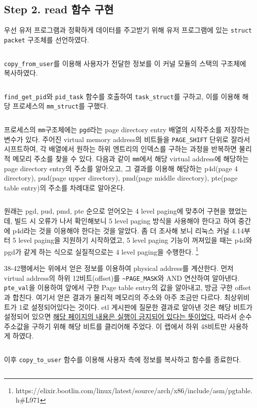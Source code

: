 \documentclass{report}
\begin{document}
\subsection{Step 2. read 함수 구현}
우선 유저 프로그램과 정확하게 데이터를 주고받기 위해 유저 프로그램에 있는 \lstinline{struct packet} 구조체를 선언하였다.
\inputminted[firstline=12,lastline=16, linenos, breaklines, obeytabs=true,tabsize=4]{C}{../kernellab-handout-done/paddr/dbfs_paddr.c}
\lstinline{copy_from_user}를 이용해 사용자가 전달한 정보를 이 커널 모듈의 스택의 구조체에 복사하였다.
\inputminted[firstline=19,lastline=27, linenos, breaklines, obeytabs=true,tabsize=4]{C}{../kernellab-handout-done/paddr/dbfs_paddr.c}
\lstinline{find_get_pid}와 \lstinline{pid_task} 함수를 호출하여 \lstinline{task_struct}를 구하고, 이를 이용해 해당 프로세스의 \lstinline{mm_struct}를 구했다.
\inputminted[firstline=28,lastline=30, linenos, breaklines, obeytabs=true,tabsize=4]{C}{../kernellab-handout-done/paddr/dbfs_paddr.c}
프로세스의 \lstinline{mm}구조체에는 \lstinline{pgd}라는 page directory entry 배열의 시작주소를 저장하는 변수가 있다. 주어진 virtual memory address의 비트들을 \lstinline{PAGE_SHIFT} 단위로 잘라서 시프트하여, 각 배열에서 원하는 하위 엔트리의 인덱스를 구하는 과정을 반복하면 물리적 메모리 주소를 찾을 수 있다.
다음과 같이 \lstinline{mm}에서 해당 virtual address에 해당하는 page directory entry의 주소를 알아오고, 그 결과를 이용해 해당하는 p4d(page 4 directory), pud(page upper directory), pmd(page middle directory), pte(page table entry)의 주소를 차례대로 알아온다.
\inputminted[firstline=31,lastline=37, linenos, breaklines, obeytabs=true,tabsize=4]{C}{../kernellab-handout-done/paddr/dbfs_paddr.c}
원래는 pgd, pud, pmd, pte 순으로 얻어오는 4 level paging에 맞추어 구현을 했었는데, 빌드 시 오류가 나서 확인해보니 5 level paging 방식을 사용해야 한다고 하여 중간에 p4d라는 것을 이용해야 한다는 것을 알았다. 좀 더 조사해 보니 리눅스 커널 4.14부터 5 level paging을 지원하기 시작하였고, 5 level paging 기능이 꺼져있을 때는 p4d와 pgd가 같게 하는 식으로 실질적으로는 4 level paging을 수행한다. \footnote[1]{https://elixir.bootlin.com/linux/latest/source/arch/x86/include/asm/pgtable.h\#L971}

38-42행에서는 위에서 얻은 정보를 이용하여 physical address를 계산한다. 먼저 virtual address의 하위 12비트(offset)를 \lstinline{~PAGE_MASK}와 AND 연산하여 알아낸다. \lstinline{pte_val}을 이용하여 앞에서 구한 Page table entry의 값을 알아내고, 방금 구한 offset과 합친다. 여기서 얻은 결과가 물리적 메모리의 주소와 아주 조금만 다르다.
최상위비트가 1로 설정되어있다는 것이다. etl 게시판에 질문한 결과로 알아낸 것은 해당 비트가 설정되어 있으면 \href{https://software.intel.com/content/dam/develop/public/us/en/documents/253668-sdm-vol-3a.pdf\#page=128}{해당 페이지의 내용은 실행이 금지되어 있다는 뜻이었다.} 따라서 순수 주소값을 구하기 위해 해당 비트를 클리어해 주었다. 이 랩에서 하위 48비트만 사용하게 하였다.
\inputminted[firstline=38,lastline=42, linenos, breaklines, obeytabs=true,tabsize=4]{C}{../kernellab-handout-done/paddr/dbfs_paddr.c}
이후 \lstinline{copy_to_user} 함수를 이용해 사용자 측에 정보를 복사하고 함수를 종료한다.
\inputminted[firstline=43,lastline=48, linenos, breaklines, obeytabs=true,tabsize=4]{C}{../kernellab-handout-done/paddr/dbfs_paddr.c}
\end{document}
